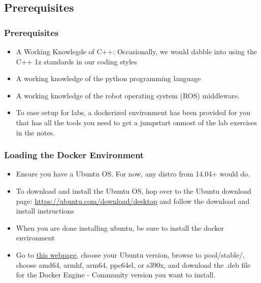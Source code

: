 
\subsection{Prerequisites}
\begin{frame}
	\frametitle{Prerequisites}
	 	\begin{itemize}
	 		 \item A Working Knowlegde of C++: Occasionally, we would dabble into using the C++ 1z standards in our coding styles
	 		\vspace{0.5em}
	 		 \item A working knowledge of the python programming language
	 		\vspace{0.5em}
	 		 \item A working knowledge of the robot operating system (ROS) middleware.
	 		\vspace{0.5em}
	 		 \item To ease setup for labs, a dockerized environment has been provided for you that has all the tools you need to get a jumpstart onmost of the lab exercises in the notes.
	 	\end{itemize}
\end{frame}

\begin{frame}
	\frametitle{Loading the Docker Environment}
	\begin{itemize}
		\item Ensure you have a Ubuntu OS. For now, any distro from 14.04+ would do.
		\vspace{.5em}
		\item To download and install the Ubuntu OS, hop over to the Ubuntu download page: \href{https://ubuntu.com/download/desktop}{https://ubuntu.com/download/desktop} and follow the download and install instructions 
		\vspace{.5em}
		\item When you are done installing ubuntu, be sure to install the docker environment 
		\vspace{.5em}
		\item Go to \href{https://download.docker.com/linux/ubuntu/dists/}{ \textsf{this webpage}}, choose your Ubuntu version, browse to  \textsf{pool/stable/, choose amd64, armhf, arm64, ppc64el, or s390x}, and download the  \textsf{.deb} file for the Docker Engine - Community version you want to install.
	\end{itemize}
\end{frame}

